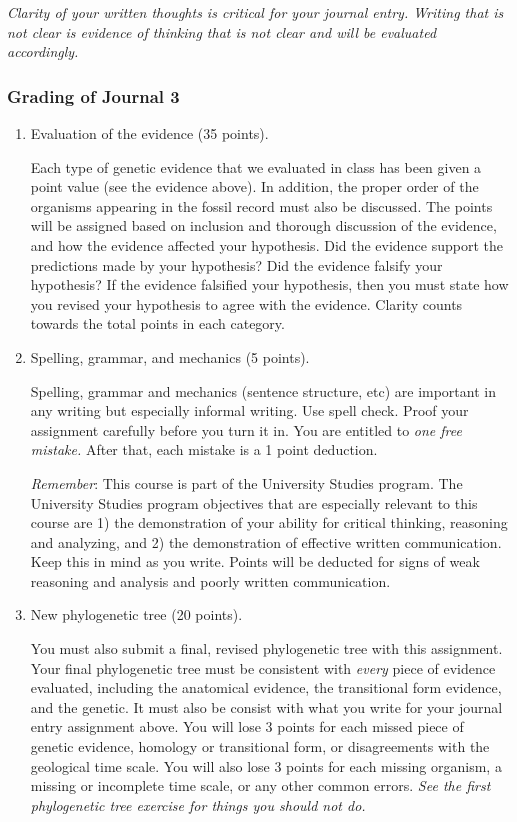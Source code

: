 \documentclass[12pt]{exam}
\begin{document}
\emph{Clarity of your written thoughts is critical for your journal entry. Writing that is not clear is evidence of
 thinking that is not clear and will be evaluated accordingly.}


\subsubsection*{Grading of Journal 3}

\begin{enumerate}

\item Evaluation of the evidence (35 points).

Each type of genetic evidence that we evaluated in class
has been given a point value (see the evidence above). In addition, the proper order
of the organisms appearing in the fossil record must also be
discussed. The points will be assigned based on inclusion and thorough
discussion of the evidence, and how the evidence affected your
hypothesis. Did the evidence support the predictions made by your
hypothesis? Did the evidence falsify your hypothesis? If the evidence
falsified your hypothesis, then you must state how you revised your
hypothesis to agree with the evidence. Clarity counts towards the total
points in each category.

\item Spelling, grammar, and mechanics (5 points).

Spelling, grammar and mechanics (sentence structure, etc) are 
important in any writing but especially informal writing. Use spell 
check. Proof your assignment carefully before you turn it in. You 
are entitled to \emph{one free mistake.} After that, each mistake 
is a 1 point deduction.

\emph{Remember}: This course is part of the University Studies
program. The University Studies program objectives that are especially
relevant to this course are 1) the demonstration of your ability for
critical thinking, reasoning and analyzing, and 2) the demonstration of
effective written communication. Keep this in mind as you write. Points will be deducted for signs of
weak reasoning and analysis and poorly written communication.

\item New phylogenetic tree (20 points).

You must also submit a final, revised phylogenetic tree with this assignment. 
Your final phylogenetic tree must be consistent with \emph{every} piece of
evidence evaluated, including the anatomical evidence, the transitional
form evidence, and the genetic. It must also be consist with what you write
for your journal entry assignment above. You will lose 3
points for each missed piece of genetic evidence, homology or transitional form, or disagreements
 with the geological time scale. You will also lose 3 points for each missing organism,
a missing or incomplete time scale, or any other common errors. \emph{See the first phylogenetic tree exercise for things you should not do.}

\end{enumerate}
\end{document}
